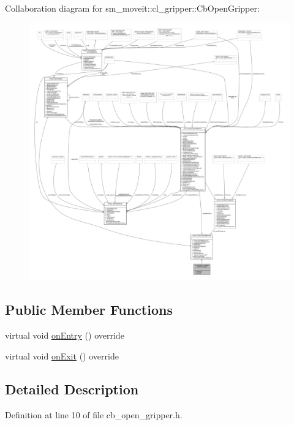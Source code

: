 Collaboration diagram for sm\+\_\+moveit\+:\+:cl\+\_\+gripper\+:\+:Cb\+Open\+Gripper\+:
\nopagebreak
\begin{figure}[H]
\begin{center}
\leavevmode
\includegraphics[width=350pt]{classsm__moveit_1_1cl__gripper_1_1CbOpenGripper__coll__graph}
\end{center}
\end{figure}
\subsection*{Public Member Functions}
\begin{DoxyCompactItemize}
\item 
virtual void \hyperlink{classsm__moveit_1_1cl__gripper_1_1CbOpenGripper_af601f6a5e2a280927a64b48100826b28}{on\+Entry} () override
\item 
virtual void \hyperlink{classsm__moveit_1_1cl__gripper_1_1CbOpenGripper_a16cdbe39be1b1789880bae04fa87531c}{on\+Exit} () override
\end{DoxyCompactItemize}


\subsection{Detailed Description}


Definition at line 10 of file cb\+\_\+open\+\_\+gripper.\+h.



